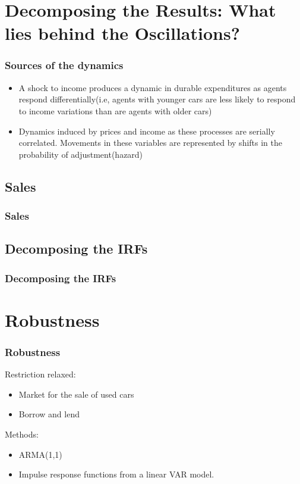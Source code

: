 \documentclass{beamer}
\begin{document}
\section{Decomposing the Results: What lies behind the Oscillations?}
\begin{frame}
\frametitle{Sources of the dynamics}
\begin{itemize}
\item A shock to income produces a dynamic in durable expenditures as agents respond differentially(i.e, agents with younger cars are less likely to respond to income variations than are agents with
older cars)
\item Dynamics induced by prices and income as these processes are serially correlated. Movements in these variables are represented by shifts in the probability of adjustment(hazard)
\end{itemize}
\end{frame}

\subsection{Sales}
\begin{frame}
\frametitle{Sales}
\end{frame}

\subsection{Decomposing the IRFs}
\begin{frame}
\frametitle{Decomposing the IRFs}
\end{frame}

\section{Robustness}
\begin{frame}
\frametitle{Robustness}
Restriction relaxed:
\begin{itemize}
\item Market for the sale of used cars
\item Borrow and lend
\end{itemize}
Methods:
\begin{itemize}
\item ARMA(1,1)
\item Impulse response functions from a linear VAR model.
\end{itemize}
\end{frame}
\end{document}
